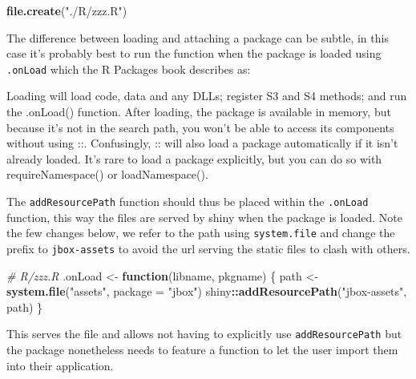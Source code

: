 \documentclass[
]{krantz}
\makeatletter
\newenvironment{Shaded}{\begin{snugshade}}{\end{snugshade}}
\newcommand{\CommentTok}[1]{\textcolor[rgb]{0.37,0.37,0.37}{\textit{#1}}}
\newcommand{\ControlFlowTok}[1]{\textcolor[rgb]{0.27,0.27,0.27}{\textbf{#1}}}
\newcommand{\DataTypeTok}[1]{\textcolor[rgb]{0.27,0.27,0.27}{#1}}
\newcommand{\KeywordTok}[1]{\textcolor[rgb]{0.27,0.27,0.27}{\textbf{#1}}}
\newcommand{\NormalTok}[1]{#1}
\newcommand{\OperatorTok}[1]{\textcolor[rgb]{0.43,0.43,0.43}{\textbf{#1}}}
\newcommand{\StringTok}[1]{\textcolor[rgb]{0.5,0.5,0.5}{#1}}
\renewenvironment{quote}{\begin{VF}}{\end{VF}}
\newenvironment{kframe}{%
\medskip{}
\setlength{\fboxsep}{.8em}
 \def\at@end@of@kframe{}%
 \ifinner\ifhmode%
  \def\at@end@of@kframe{\end{minipage}}%
  \begin{minipage}{\columnwidth}%
 \fi\fi%
 \def\FrameCommand##1{\hskip\@totalleftmargin \hskip-\fboxsep
 \colorbox{shadecolor}{##1}\hskip-\fboxsep
     \hskip-\linewidth \hskip-\@totalleftmargin \hskip\columnwidth}%
 \MakeFramed {\advance\hsize-\width
   \@totalleftmargin\z@ \linewidth\hsize
   \@setminipage}}%
 {\par\unskip\endMakeFramed%
 \at@end@of@kframe}
\renewenvironment{Shaded}{\begin{kframe}}{\end{kframe}}
\makeatother
\begin{document}
\begin{Shaded}
\begin{Highlighting}[]
\KeywordTok{file.create}\NormalTok{(}\StringTok{"./R/zzz.R"}\NormalTok{)}
\end{Highlighting}
\end{Shaded}

The difference between loading and attaching a package can be subtle, in this case it's probably best to run the function when the package is loaded using \texttt{.onLoad} which the R Packages book describes as:

\begin{quote}
Loading will load code, data and any DLLs; register S3 and S4 methods; and run the .onLoad() function. After loading, the package is available in memory, but because it's not in the search path, you won't be able to access its components without using ::. Confusingly, :: will also load a package automatically if it isn't already loaded. It's rare to load a package explicitly, but you can do so with requireNamespace() or loadNamespace().
\end{quote}

The \texttt{addResourcePath} function should thus be placed within the \texttt{.onLoad} function, this way the files are served by shiny when the package is loaded. Note the few changes below, we refer to the path using \texttt{system.file} and change the prefix to \texttt{jbox-assets} to avoid the url serving the static files to clash with others.

\begin{Shaded}
\begin{Highlighting}[]
\CommentTok{\# R/zzz.R}
\NormalTok{.onLoad \textless{}{-}}\StringTok{ }\ControlFlowTok{function}\NormalTok{(libname, pkgname) \{}
\NormalTok{  path \textless{}{-}}\StringTok{ }\KeywordTok{system.file}\NormalTok{(}\StringTok{"assets"}\NormalTok{, }\DataTypeTok{package =} \StringTok{"jbox"}\NormalTok{)}
\NormalTok{  shiny}\OperatorTok{::}\KeywordTok{addResourcePath}\NormalTok{(}\StringTok{"jbox{-}assets"}\NormalTok{, path)}
\NormalTok{\}}
\end{Highlighting}
\end{Shaded}

This serves the file and allows not having to explicitly use \texttt{addResourcePath} but the package nonetheless needs to feature a function to let the user import them into their application.
\end{document}
